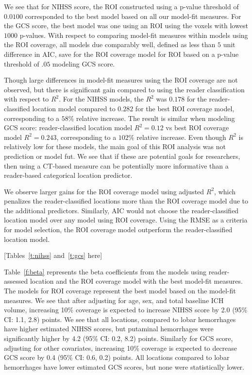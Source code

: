 \documentclass[10pt]{article}\usepackage[]{graphicx}\usepackage[]{color}
\begin{document}
We see that for NIHSS score, the ROI constructed using a p-value threshold of $0.0100$ corresponded to the best model based on all our model-fit measures.  For the GCS score, the best model was one using an ROI using the voxels with lowest $1000$ p-values.  With respect to comparing model-fit measures within models using the ROI coverage, all models due comparably well, defined as less than $5$ unit difference in AIC, save for the ROI coverage model for ROI based on a p-value threshold of $.05$ modeling GCS score.

Though large differences in model-fit measures using the ROI coverage are not observed, but there is significant gain compared to using the reader classification with respect to $R^2$.
For the NIHSS models, the $R^2$ was $0.178$ for the reader-classified location model compared to $0.282$ for the best ROI coverage model, corresponding to a $58\%$ relative increase.  The result is similar when modeling GCS score: reader-classified location model $R^2 = 0.12$ vs best ROI coverage model $R^2 = 0.243$, corresponding to a $102\%$ relative increase.  Even though $R^2$ is relatively low for these models, the main goal of this ROI analysis was not prediction or model fut.  We see that if these are potential goals for researchers, then using a CT-based measure can be potentially more informative than a reader-based categorical location predictor. 

We observe larger gains for the ROI coverage model using adjusted $R^2$, which penalizes the reader-classified locations more than the ROI coverage model due to the additional predictors.  Similarly, AIC would not choose the reader-classified location model over any model using ROI coverage.  Using the RMSE as a criteria for model selection, the ROI coverage model outperform the reader-classified location model.  


[Tables~\ref{t:nihss} and~\ref{t:gcs} here]



Table~\ref{f:beta} represents the beta coefficients from the models using reader-assessed location and the ROI coverage model with the best model-fit measures.  The models for ROI coverage represent the best model based on the model-fit measures. We see that after adjusting for age, sex, and total baseline ICH volume, increasing 10\% coverage is expected to increase NIHSS score by 2.0 (95\% CI: 1.1, 2.8) points.  We see that all locations, compared to lobar hemorrhages have higher estimated NIHSS scores, but putaminal hemorrhages were significantly higher by 4.2 (95\% CI: 0.2, 8.2) points. 
Similarly for GCS score, adjusting for other covariates, increasing 10\% coverage is expected to decrease GCS score by 0.4 (95\% CI: 0.6, 0.2) points.  All locations compared to lobar hemorrhages have lower estimated GCS scores, but none were statistically lower.
\end{document}
